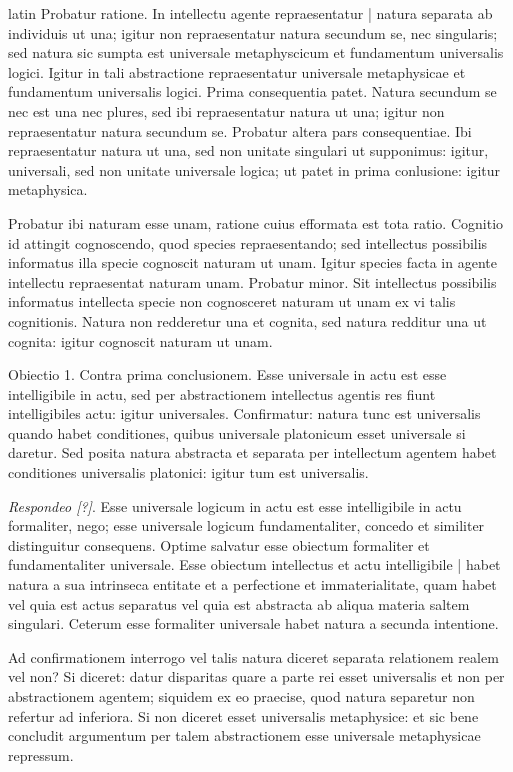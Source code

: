 \begin{otherlanguage*}{latin}
\pstart
Probatur ratione. In intellectu agente repraesentatur \textnormal{|} natura separata ab individuis ut una; igitur non repraesentatur natura secundum se, nec singularis; sed natura sic sumpta est universale metaphyscicum et fundamentum universalis logici. Igitur in tali abstractione repraesentatur universale metaphysicae et fundamentum universalis logici. Prima consequentia patet. Natura secundum se nec est una nec plures, sed ibi repraesentatur natura ut una; igitur non repraesentatur natura secundum se. Probatur altera pars consequentiae. Ibi repraesentatur natura ut una, sed non unitate singulari ut supponimus:
igitur, universali, sed non unitate universale logica; ut patet in prima conlusione:
igitur metaphysica. 
\pend

\pstart
Probatur ibi naturam esse unam, ratione cuius efformata est tota ratio. Cognitio id attingit cognoscendo, quod species repraesentando; sed intellectus possibilis informatus illa specie cognoscit naturam ut unam. Igitur species facta in agente intellectu repraesentat naturam unam. Probatur minor. Sit intellectus possibilis informatus intellecta specie non cognosceret naturam ut unam ex vi talis cognitionis. Natura non redderetur una et cognita, sed natura redditur una ut cognita:
igitur cognoscit naturam ut unam. 
\pend

\pstart
Obiectio 1. Contra prima conclusionem. Esse universale in actu est esse intelligibile in actu, sed per abstractionem intellectus agentis res fiunt intelligibiles actu:
igitur universales. Confirmatur:
natura tunc est universalis quando habet conditiones, quibus universale platonicum esset universale si daretur. Sed posita natura abstracta et separata per intellectum agentem habet conditiones universalis platonici:
igitur tum est universalis. 
\pend

\pstart
\emph{Respondeo [?]}. Esse universale logicum in actu est esse intelligibile in actu formaliter, nego; esse universale logicum fundamentaliter, concedo et similiter distinguitur consequens. Optime salvatur esse obiectum formaliter et fundamentaliter universale. Esse obiectum intellectus et actu intelligibile \textnormal{|} habet natura a sua intrinseca entitate et a perfectione et immaterialitate, quam habet vel quia est actus separatus vel quia est abstracta ab aliqua materia saltem singulari. Ceterum esse formaliter universale habet natura a secunda intentione. 
\pend

\pstart
Ad confirmationem interrogo vel talis natura diceret separata relationem realem vel non? Si diceret:
datur disparitas quare a parte rei esset universalis et non per abstractionem agentem; siquidem ex eo praecise, quod natura separetur non refertur ad inferiora. Si non diceret esset universalis metaphysice:
et sic bene concludit argumentum per talem abstractionem esse universale metaphysicae repressum. 
\pend


\end{otherlanguage*}
